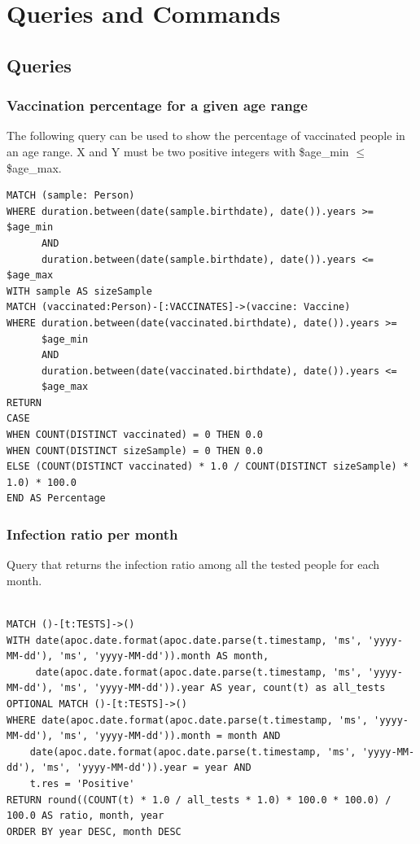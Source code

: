 \documentclass{article}
\begin{document}
\section{Queries and Commands}
\subsection{Queries}
\subsubsection{Vaccination percentage for a given age range}
The following query can be used to show the percentage of vaccinated people in an age range.
X and Y must be two positive integers with \$age\_min $\le$ \$age\_max.\\

\begin{lstlisting}[language=cypher, label=lst:cypher-example]
MATCH (sample: Person)
WHERE duration.between(date(sample.birthdate), date()).years >= $age_min
      AND
      duration.between(date(sample.birthdate), date()).years <= $age_max
WITH sample AS sizeSample
MATCH (vaccinated:Person)-[:VACCINATES]->(vaccine: Vaccine)
WHERE duration.between(date(vaccinated.birthdate), date()).years >=   
      $age_min
      AND
      duration.between(date(vaccinated.birthdate), date()).years <=   
      $age_max
RETURN 
CASE
WHEN COUNT(DISTINCT vaccinated) = 0 THEN 0.0
WHEN COUNT(DISTINCT sizeSample) = 0 THEN 0.0
ELSE (COUNT(DISTINCT vaccinated) * 1.0 / COUNT(DISTINCT sizeSample) * 1.0) * 100.0 
END AS Percentage

\end{lstlisting}
\subsubsection{Infection ratio per month}
Query that returns the infection ratio among all the tested people for each month.
\begin{lstlisting}[language=cypher, label=lst:cypher-example]

MATCH ()-[t:TESTS]->()
WITH date(apoc.date.format(apoc.date.parse(t.timestamp, 'ms', 'yyyy-MM-dd'), 'ms', 'yyyy-MM-dd')).month AS month,
     date(apoc.date.format(apoc.date.parse(t.timestamp, 'ms', 'yyyy-MM-dd'), 'ms', 'yyyy-MM-dd')).year AS year, count(t) as all_tests
OPTIONAL MATCH ()-[t:TESTS]->()
WHERE date(apoc.date.format(apoc.date.parse(t.timestamp, 'ms', 'yyyy-MM-dd'), 'ms', 'yyyy-MM-dd')).month = month AND
    date(apoc.date.format(apoc.date.parse(t.timestamp, 'ms', 'yyyy-MM-dd'), 'ms', 'yyyy-MM-dd')).year = year AND
    t.res = 'Positive'
RETURN round((COUNT(t) * 1.0 / all_tests * 1.0) * 100.0 * 100.0) / 100.0 AS ratio, month, year
ORDER BY year DESC, month DESC
\end{lstlisting}
\end{document}
